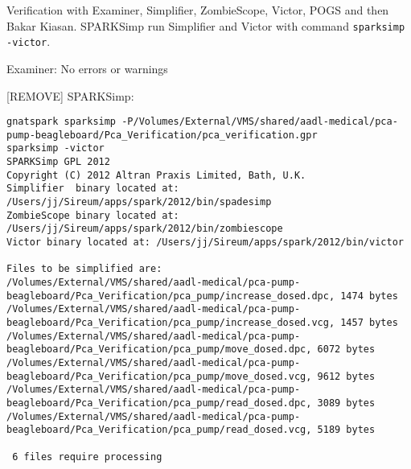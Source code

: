 Verification with Examiner, Simplifier, ZombieScope, Victor, POGS and then Bakar Kiasan.
SPARKSimp run Simplifier and Victor with command \lstinline{sparksimp -victor}.

Examiner:
No errors or warnings

[REMOVE] SPARKSimp:
\begin{lstlisting}[frame=single, gobble=0, caption={SPARKSimp output}, label={listing:pcapump_dosemonitor_sparksimp}]
gnatspark sparksimp -P/Volumes/External/VMS/shared/aadl-medical/pca-pump-beagleboard/Pca_Verification/pca_verification.gpr
sparksimp -victor
SPARKSimp GPL 2012
Copyright (C) 2012 Altran Praxis Limited, Bath, U.K.
Simplifier  binary located at: /Users/jj/Sireum/apps/spark/2012/bin/spadesimp
ZombieScope binary located at: /Users/jj/Sireum/apps/spark/2012/bin/zombiescope
Victor binary located at: /Users/jj/Sireum/apps/spark/2012/bin/victor

Files to be simplified are:
/Volumes/External/VMS/shared/aadl-medical/pca-pump-beagleboard/Pca_Verification/pca_pump/increase_dosed.dpc, 1474 bytes
/Volumes/External/VMS/shared/aadl-medical/pca-pump-beagleboard/Pca_Verification/pca_pump/increase_dosed.vcg, 1457 bytes
/Volumes/External/VMS/shared/aadl-medical/pca-pump-beagleboard/Pca_Verification/pca_pump/move_dosed.dpc, 6072 bytes
/Volumes/External/VMS/shared/aadl-medical/pca-pump-beagleboard/Pca_Verification/pca_pump/move_dosed.vcg, 9612 bytes
/Volumes/External/VMS/shared/aadl-medical/pca-pump-beagleboard/Pca_Verification/pca_pump/read_dosed.dpc, 3089 bytes
/Volumes/External/VMS/shared/aadl-medical/pca-pump-beagleboard/Pca_Verification/pca_pump/read_dosed.vcg, 5189 bytes

 6 files require processing


\end{lstlisting}
